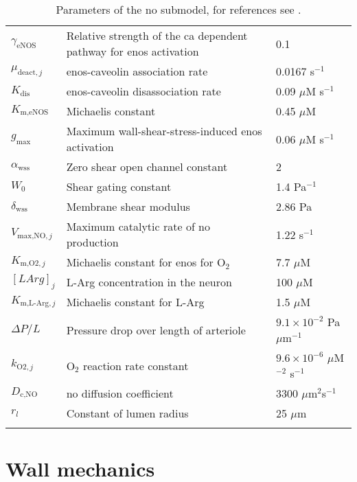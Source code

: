 \documentclass[11pt]{elsarticle}
\newcommand{\mus}{$\mu$M s$^{-1}$\xspace}
\newcommand{\ox}{O$_2$\xspace}
\newcommand{\uM}{$\mu$M\xspace}
\newcommand{\um}{$\mu$m\xspace}
\newcommand{\n}{$^{-1}$\xspace}
\newcommand{\e}[1]{\times 10^{#1}}
\newcommand{\ca}{\gls{ca}\xspace}
\newlength{\drop} %
\begin{document}
\begin{longtable}[h!]{ p{0.12\linewidth}   p{0.64\linewidth}   p{0.24\linewidth} }
$ \gamma_{\text{eNOS}} $	& Relative strength of the \ca dependent pathway for \gls{enos} activation	& 0.1 	\\
$ \mu_{\text{deact},j} $	& \gls{enos}-caveolin association rate											& 0.0167 s\n	\\
$ K_{\text{dis}} $			& \gls{enos}-caveolin disassociation rate											& 0.09 \mus	\\
$ K_{\text{m,eNOS}} $		& Michaelis constant														& 0.45 \uM		\\
$ g_{\max} $		& Maximum wall-shear-stress-induced \gls{enos} activation			& 0.06 \mus	\\
$ \alpha_{\text{wss}} $				& Zero shear open channel constant						& 2 		\\
$ W_0 $					& Shear gating constant 									& 1.4 Pa\n			\\
$ \delta_{\text{wss}} $		& Membrane shear modulus			& 2.86 Pa		\\
$ V_{\text{max,NO},j} $ 	& Maximum catalytic rate of \gls{no} production		& 1.22 s\n		\\ 
$ K_{\text{m,O2},j} $		& Michaelis constant for \gls{enos} for \ox  		& 7.7 \uM 	 \\
$ [LArg]_j $				& L-Arg concentration in the neuron 		& 100 \uM 	 \\ 
$ K_{\text{m,L-Arg},j} $	& Michaelis constant for L-Arg 			& 1.5 \uM  \\
$ \Delta P / L $			& Pressure drop over length of arteriole	& $9.1\e{-2}$ Pa \um\n 	\\
$ k_{\text{O2},j} $ 		& \ox reaction rate constant			& $9.6\e{-6}$ \uM$^{-2}$ s\n \\ 
$ D_{\text{c,NO}} $			& \Gls{no} diffusion coefficient	& 3300 \um$^2$s\n  \\
$r_l$	& Constant of lumen radius & 25 \um \\
\hline
\caption{Parameters of the \gls{no} submodel, for references see \citet{Dormanns2016}.}
\end{longtable}	


\section{Wall mechanics}
\end{document}
